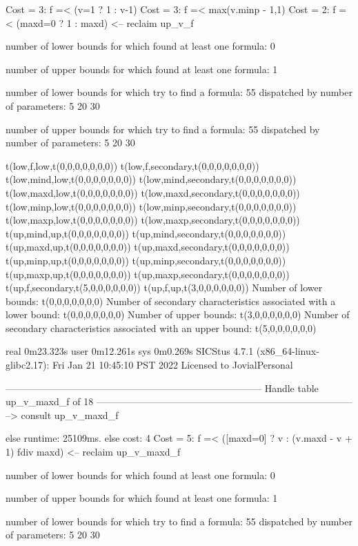 Cost =  3:  f =< (v=1 ? 1 : v-1)
Cost =  3:  f =< max(v.minp - 1,1)
Cost =  2:  f =< (maxd=0 ? 1 : maxd)
<-- reclaim up_v_f

number of lower bounds for which found at least one formula: 0

number of upper bounds for which found at least one formula: 1

number of lower bounds for which try to find a formula: 55
dispatched by number of parameters: 5  20  30

number of upper bounds for which try to find a formula: 55
dispatched by number of parameters: 5  20  30

t(low,f,low,t(0,0,0,0,0,0,0))
t(low,f,secondary,t(0,0,0,0,0,0,0))
t(low,mind,low,t(0,0,0,0,0,0,0))
t(low,mind,secondary,t(0,0,0,0,0,0,0))
t(low,maxd,low,t(0,0,0,0,0,0,0))
t(low,maxd,secondary,t(0,0,0,0,0,0,0))
t(low,minp,low,t(0,0,0,0,0,0,0))
t(low,minp,secondary,t(0,0,0,0,0,0,0))
t(low,maxp,low,t(0,0,0,0,0,0,0))
t(low,maxp,secondary,t(0,0,0,0,0,0,0))
t(up,mind,up,t(0,0,0,0,0,0,0))
t(up,mind,secondary,t(0,0,0,0,0,0,0))
t(up,maxd,up,t(0,0,0,0,0,0,0))
t(up,maxd,secondary,t(0,0,0,0,0,0,0))
t(up,minp,up,t(0,0,0,0,0,0,0))
t(up,minp,secondary,t(0,0,0,0,0,0,0))
t(up,maxp,up,t(0,0,0,0,0,0,0))
t(up,maxp,secondary,t(0,0,0,0,0,0,0))
t(up,f,secondary,t(5,0,0,0,0,0,0))
t(up,f,up,t(3,0,0,0,0,0,0))
Number of lower bounds:                                             t(0,0,0,0,0,0,0)
Number of secondary characteristics associated with a lower bound:  t(0,0,0,0,0,0,0)
Number of upper bounds:                                             t(3,0,0,0,0,0,0)
Number of secondary characteristics associated with an upper bound: t(5,0,0,0,0,0,0)

real	0m23.323s
user	0m12.261s
sys	0m0.269s
SICStus 4.7.1 (x86_64-linux-glibc2.17): Fri Jan 21 10:45:10 PST 2022
Licensed to JovialPersonal


--------------------------------------------------------------------------------
Handle table up_v_maxd_f of 18
--------------------------------------------------------------------------------
--> consult up_v_maxd_f

else runtime: 25109ms. else cost: 4
Cost =  5:  f =< ([maxd=0] ? v : (v.maxd - v + 1) fdiv maxd) %
<-- reclaim up_v_maxd_f

number of lower bounds for which found at least one formula: 0

number of upper bounds for which found at least one formula: 1

number of lower bounds for which try to find a formula: 55
dispatched by number of parameters: 5  20  30

